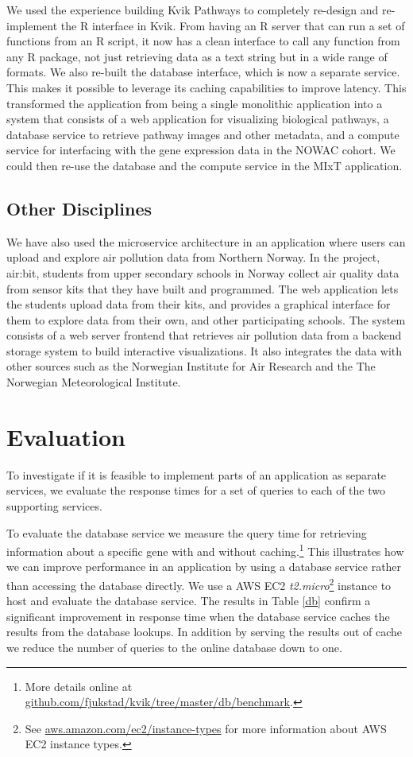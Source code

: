 We used the experience building Kvik Pathways to completely re-design and
re-implement the R interface in Kvik. From having an R server that can run a
set of functions from an R script, it now has a clean interface to call any
function from any R package, not just retrieving data as a text string but in a
wide range of formats. We also re-built the database interface, which is now a
separate service. This makes it possible to leverage its caching capabilities
to improve latency. This transformed the application from being a single
monolithic application into a system that consists of a web application for
visualizing biological pathways, a database service to retrieve pathway images
and other metadata, and a compute service for interfacing with the gene
expression data in the NOWAC cohort. We could then re-use the database and the
compute service in the MIxT application. 


\subsection{Other Disciplines}
We have also used the microservice architecture in an application where users
can upload and explore air pollution data from Northern
Norway.\cite{fjukstad2018low} In the project, air:bit, students from upper
secondary schools in Norway collect air quality data from sensor kits that they
have built and programmed. The web application lets the students upload data
from their kits, and provides a graphical interface for them to explore data
from their own, and other participating schools. The system consists of a web
server frontend that retrieves air pollution data from a backend storage system
to build interactive visualizations. It also integrates the data with other
sources such as the Norwegian Institute for Air Research and the The Norwegian
Meteorological Institute. 


\section{Evaluation} 

To investigate if it is feasible to implement parts of an application as
separate services, we evaluate the response times for a set of queries to each
of the two supporting services. 

To evaluate the database service we measure the query time for retrieving
information about a specific gene with and without caching.\footnote{More
details online at \url{github.com/fjukstad/kvik/tree/master/db/benchmark}.} This
illustrates how we can improve performance in an application by using a database
service rather than accessing the database directly. 
We use a AWS EC2 \emph{t2.micro}\footnote{See
\url{aws.amazon.com/ec2/instance-types} for more information about AWS EC2
instance types.} instance to host and evaluate the database service.  The
results in Table \ref{db} confirm a significant improvement in response time
when the database service caches the results from the database lookups. In
addition by serving the results out of cache we reduce the number of queries to
the online database down to one. 

